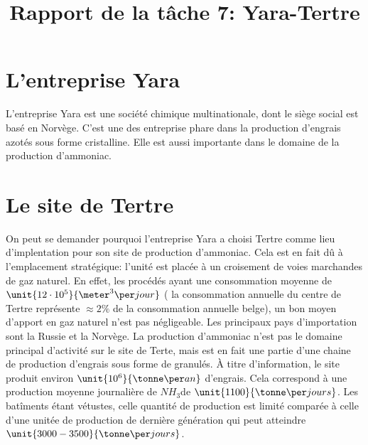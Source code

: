 

\title{Rapport de la tâche 7: Yara-Tertre}
\maketitle
\newpage
\section*{L'entreprise Yara}
L'entreprise Yara est une société chimique multinationale, dont le siège social est basé en Norvège. C'est une des entreprise phare dans la production d'engrais azotés sous forme cristalline. Elle est aussi importante dans le domaine de la production d'ammoniac.
\section*{Le site de Tertre}
On peut se demander pourquoi l'entreprise Yara a choisi Tertre comme
 lieu d'implentation pour son site de production d'ammoniac. Cela est en fait dû à l'emplacement stratégique: l'unité est placée à un croisement de voies marchandes de gaz naturel. En effet, les procédés ayant une consommation moyenne de $\unit{12 \cdot 10^5}{\meter^3\per jour}$ ( la consommation annuelle du centre de Tertre représente $\approx 2\%$ de la consommation annuelle belge), un bon moyen d'apport en gaz naturel n'est pas négligeable. Les principaux pays d'importation sont la Russie et la Norvège.
   La production d'ammoniac n'est pas le domaine principal d'activité sur le site de
    Terte, mais est en fait une partie d'une chaine de production d'engrais sous
     forme de granulés. À titre d'information, le site produit
     environ $\unit{10^6}{\tonne\per an}$ d'engrais. Cela correspond
     à une production moyenne journalière de $NH_3$de $\unit{1100}{\tonne\per jours}$.
      Les batîments étant vétustes, celle quantité de production est limité
       comparée à celle d'une unitée de production de dernière génération qui peut atteindre $\unit{3000-3500}{\tonne\per jours}$. 
